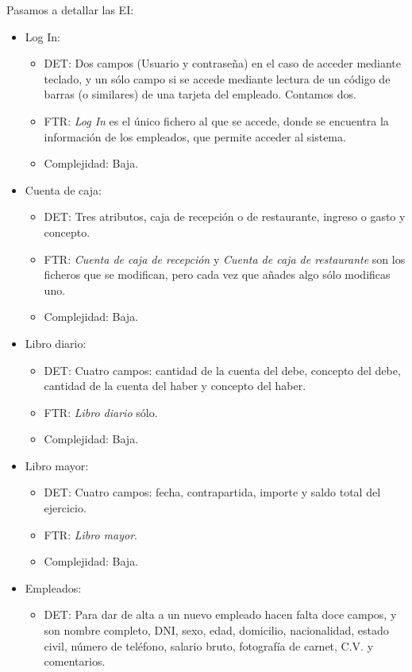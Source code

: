 \documentclass[spanish,a4paper,11pt, twoside]{report}	%
\begin{document}
	Pasamos a detallar las EI:
	\begin{itemize}
		\item{Log In:} 
		\begin{itemize}
 			\item{DET:} Dos campos (Usuario y contraseña) en el caso de acceder mediante teclado, y un sólo campo si se accede mediante lectura de un código de barras (o similares) de una tarjeta del empleado. Contamos dos.
			\item{FTR:} \textit{Log In} es el único fichero al que se accede, donde se encuentra la información de los empleados, que permite acceder al sistema.
			\item{Complejidad:} Baja.
		\end{itemize}	
		\item{Cuenta de caja:} 
		\begin{itemize}
 			\item{DET:} Tres atributos, caja de recepción o de restaurante, ingreso o gasto y concepto.
			\item{FTR:} \textit{Cuenta de caja de recepción} y \textit{Cuenta de caja de restaurante} son los ficheros que se modifican, pero cada vez que añades algo sólo modificas uno.
			\item{Complejidad:} Baja.
		\end{itemize}
		\item{Libro diario:} 
		\begin{itemize}
 			\item{DET:} Cuatro campos: cantidad de la cuenta del debe, concepto del debe, cantidad de la cuenta del haber y concepto del haber.
			\item{FTR:} \textit{Libro diario} sólo.
			\item{Complejidad:} Baja.
		\end{itemize}
		\item{Libro mayor:} 
		\begin{itemize}
 			\item{DET:} Cuatro campos: fecha, contrapartida, importe y saldo total del ejercicio.
			\item{FTR:} \textit{Libro mayor}.
			\item{Complejidad:} Baja.
		\end{itemize}
		\item{Empleados:} 
		\begin{itemize}
 			\item{DET:} Para dar de alta a un nuevo empleado hacen falta doce campos, y son nombre completo, DNI, sexo, edad, domicilio, nacionalidad, estado civil, número de teléfono, salario bruto, fotografía de carnet, C.V. y comentarios.

\end{itemize}
\end{itemize}
\end{document}
